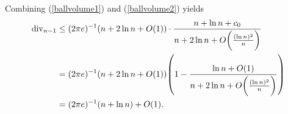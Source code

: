 Combining (\ref{ballvolume1}) and (\ref{ballvolume2}) yields
\begin{align}\label{divleq}
\divv_{n-1} &\leq (2\pi e)^{-1}(n+2\ln n+O(1))\cdot\frac{n+\ln n+c_0}{n+2\ln n +O\bigg(\frac{(\ln n)^2}{n}\bigg)} 
\nonumber\\&= (2\pi e)^{-1}(n+2\ln n+O(1))\left(1-\frac{\ln n+O(1)}{n+2\ln n +O\bigg(\frac{(\ln n)^2}{n}\bigg)}\right)
\nonumber\\& = (2\pi e)^{-1}(n+\ln n)+O(1).
\end{align}



\vspace{2mm}

